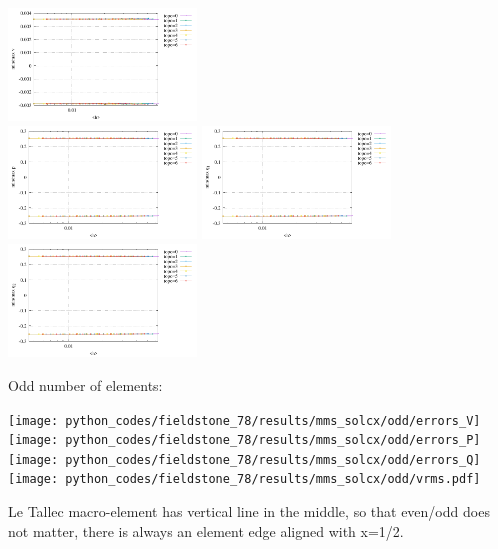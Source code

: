\begin{center}
\includegraphics[width=5cm]{python_codes/fieldstone_78/results/stats_v_exp13.pdf}\\
\includegraphics[width=5cm]{python_codes/fieldstone_78/results/stats_p_exp13.pdf}
\includegraphics[width=5cm]{python_codes/fieldstone_78/results/stats_q1_exp13.pdf}
\includegraphics[width=5cm]{python_codes/fieldstone_78/results/stats_q2_exp13.pdf}
\end{center}

Odd number of elements:

\begin{center}
\texttt{[image: python\_codes/fieldstone\_78/results/mms\_solcx/odd/errors\_V]}
\texttt{[image: python\_codes/fieldstone\_78/results/mms\_solcx/odd/errors\_P]}\\
\texttt{[image: python\_codes/fieldstone\_78/results/mms\_solcx/odd/errors\_Q]}
\texttt{[image: python\_codes/fieldstone\_78/results/mms\_solcx/odd/vrms.pdf]}
\end{center}

Le Tallec macro-element has vertical line in the middle, so that 
even/odd does not matter, there is always an element edge aligned with x=1/2.



